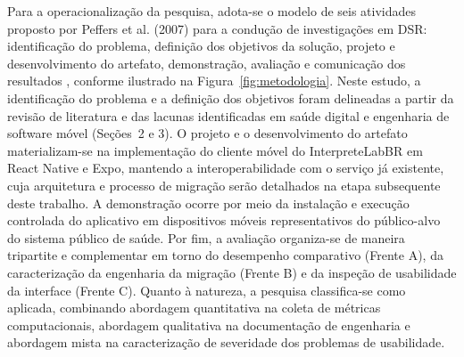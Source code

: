 \documentclass[12pt]{article}
\begin{document}
Para a operacionalização da pesquisa, adota-se o modelo de seis atividades proposto por Peffers et al. (2007) para a condução de investigações em DSR: identificação do problema, definição dos objetivos da solução, projeto e desenvolvimento do artefato, demonstração, avaliação e comunicação dos resultados \cite{peffers2007}, conforme ilustrado na Figura~\ref{fig:metodologia}. Neste estudo, a identificação do problema e a definição dos objetivos foram delineadas a partir da revisão de literatura e das lacunas identificadas em saúde digital e engenharia de software móvel (Seções~2 e 3). O projeto e o desenvolvimento do artefato materializam-se na implementação do cliente móvel do InterpreteLabBR em React Native e Expo, mantendo a interoperabilidade com o serviço já existente, cuja arquitetura e processo de migração serão detalhados na etapa subsequente deste trabalho. A demonstração ocorre por meio da instalação e execução controlada do aplicativo em dispositivos móveis representativos do público-alvo do sistema público de saúde. Por fim, a avaliação organiza-se de maneira tripartite e complementar em torno do desempenho comparativo (Frente A), da caracterização da engenharia da migração (Frente B) e da inspeção de usabilidade da interface (Frente C). Quanto à natureza, a pesquisa classifica-se como aplicada, combinando abordagem quantitativa na coleta de métricas computacionais, abordagem qualitativa na documentação de engenharia e abordagem mista na caracterização de severidade dos problemas de usabilidade.
\end{document}
